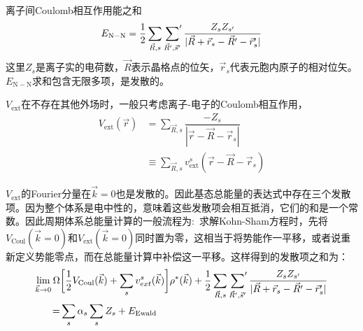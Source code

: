 离子间\textrm{Coulomb}相互作用能之和
\begin{equation}
	E_{\mathrm{N-N}}=\dfrac12\sum_{\vec R,s}\sideset{}{^{\prime}}\sum_{\vec R^{\prime},\vec s^{\prime}}\dfrac{Z_sZ_{s^{\prime}}}{|\vec R+\vec r_s-\vec R^{\prime}-\vec r_s^{\prime}|}
\end{equation}
这里$Z_s$是离子实的电荷数，$\vec R$表示晶格点的位矢，$\vec r_s$代表元胞内原子的相对位矢。$E_{\mathrm{N-N}}$求和包含无限多项，是发散的。
	
$V_{\mathrm{ext}}$在不存在其他外场时，一般只考虑离子-电子的\textrm{Coulomb}相互作用，
	\begin{equation}
		\begin{aligned}
			V_{\mathrm{ext}}(\vec r)&=\sum_{\vec R,s}\dfrac{-Z_s}{|\vec r-\vec R-\vec r_s|}\\
			&\equiv\sum_{\vec R,s}v_{\mathrm{ext}}^s(\vec r-\vec R-\vec r_s)
		\end{aligned}
	\end{equation}

	$V_{\mathrm{ext}}$的\textrm{Fourier}分量在$\vec k=0$也是发散的。因此基态总能量的表达式中存在三个发散项。因为整个体系是电中性的，意味着这些发散项会相互抵消，它们的和是一个常数\cite{JPC-SSP12-4409_1979}。因此周期体系总能量计算的一般流程为:~求解\textrm{Kohn-Sham}方程时，先将$V_{\mathrm{Coul}}(\vec k=0)$和$V_{\mathrm{ext}}(\vec k=0)$同时置为零，这相当于将势能作一平移，或者说重新定义势能零点，而在总能量计算中补偿这一平移。这样得到的发散项之和为：
	\begin{equation}
		\begin{aligned}
			\lim_{\vec k\rightarrow0}\Omega&\bigg[\dfrac12V_{\mathrm{Coul}}(\vec k)+\sum_sv_{ext}^s(\vec k)\bigg]\rho^{\ast}(\vec k)+\dfrac12\sum_{\vec R,s}\sideset{}{^{\prime}}\sum_{\vec R^{\prime},\vec s^{\prime}}\dfrac{Z_sZ_{s^{\prime}}}{|\vec R+\vec r_s-\vec R^{\prime}-\vec r_s^{\prime}|}\\
			=&\sum_s\alpha_s\sum_sZ_s+E_{\mathrm{Ewald}}
		\end{aligned}
	\end{equation}

